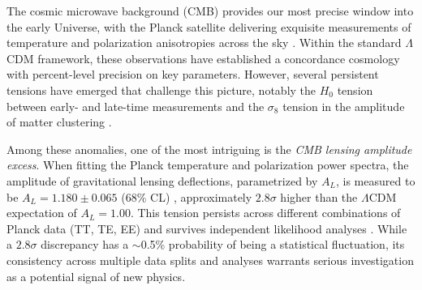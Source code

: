 The cosmic microwave background (CMB) provides our most precise window into the early Universe, with the Planck satellite delivering exquisite measurements of temperature and polarization anisotropies across the sky \citep{Planck2018_params,Planck2018_cosmo}. Within the standard $\Lambda$CDM framework, these observations have established a concordance cosmology with percent-level precision on key parameters. However, several persistent tensions have emerged that challenge this picture, notably the $H_0$ tension between early- and late-time measurements \citep{Riess2022,DiValentino2021_tensions} and the $\sigma_8$ tension in the amplitude of matter clustering \citep{Heymans2021,Abbott2022_DES}.

Among these anomalies, one of the most intriguing is the \emph{CMB lensing amplitude excess}. When fitting the Planck temperature and polarization power spectra, the amplitude of gravitational lensing deflections, parametrized by $A_L$, is measured to be $A_L = 1.180 \pm 0.065$ (68\% CL) \citep{Planck2018_lensing}, approximately $2.8\sigma$ higher than the $\Lambda$CDM expectation of $A_L = 1.00$. This tension persists across different combinations of Planck data (TT, TE, EE) and survives independent likelihood analyses \citep{Motherwell2023,Rosenberg2022}. While a $2.8\sigma$ discrepancy has a $\sim$0.5\% probability of being a statistical fluctuation, its consistency across multiple data splits and analyses warrants serious investigation as a potential signal of new physics.

